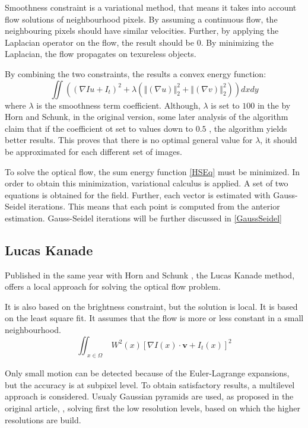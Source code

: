 \documentclass[12pt,a4paper,twoside]{report}
\begin{document}
Smoothness constraint is a variational method, that means it takes into account flow solutions of neighbourhood pixels. By assuming a continuous flow, the neighbouring pixels should have similar velocities\cite{HSOpticalFlow}. Further, by applying the Laplacian operator on the flow, the result should be 0. By minimizing the Laplacian, the flow propagates on texureless objects.

By combining the two constraints, the results a convex energy function:
\begin{equation} \label{HSEq}
	\iint  ((\nabla Iu + I_t)^2 + \lambda(\left\Vert(\nabla u) \right\Vert_2^2 +\left\Vert(\nabla v) \right\Vert_2^2))dxdy
\end{equation}
where $\lambda$ is the smoothness term coefficient. Although, $\lambda$ is set to $100$ in the by Horn and Schunk, in the original version, some later analysis of the algorithm claim that if the coefficient ot set to values down to $0.5$ \cite{barron1994}, the algorithm yields better results. This proves that there is no optimal general value for $\lambda$, it should be approximated for each different set of images.

To solve the optical flow, the sum energy function \ref{HSEq} must be minimized. In order to obtain this minimization, variational calculus is applied. A set of two equations is obtained for the field.
Further, each vector is estimated with Gauss-Seidel iterations. This means that each point is computed from the anterior estimation. Gauss-Seidel iterations will be further discussed in \ref{GaussSeidel}


\subsection{Lucas Kanade}

Published in the same year with Horn and Schunk \cite{HSOpticalFlow}, the Lucas Kanade method\cite{lucas1981}, offers a local approach for solving the optical flow problem. 

It is also based on the brightness constraint, but the solution is local.
It is based on the least square fit. It assumes that the flow is more or less constant in a small neighbourhood. 
\begin{equation} 
\iint_{\substack{x \in \Omega}}
W^2(x)[\nabla I(x)\cdot \boldsymbol{v}+I_t(x)]^2
\end{equation}

Only small motion can be detected because of the Euler-Lagrange expansions, but the accuracy is at subpixel level. To obtain satisfactory results, a multilevel approach is considered. Usualy Gaussian pyramids are used, as proposed in the original article, \cite{lucas1981}, solving first the low resolution levels, based on which the higher resolutions are build. 
\end{document}
